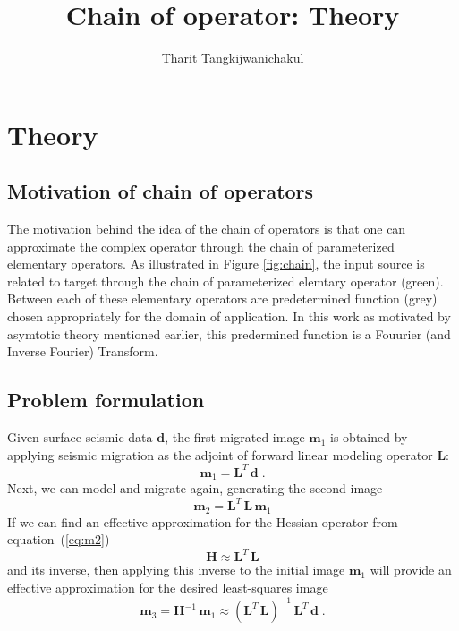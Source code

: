 \title{Chain of operator: Theory}
\author{Tharit Tangkijwanichakul}
\label{ch:chapter-background}
\maketitle
{}

\newcommand\inv[1]{#1\raisebox{1.15ex}{$\scriptscriptstyle-\!1$}} %



\section{Theory}


\subsection{Motivation of chain of operators}


The motivation behind the idea of the chain of operators is that one can approximate the complex operator through the chain of parameterized elementary operators. As illustrated in Figure \ref{fig:chain}, the input source is related to target through the chain of parameterized elemtary operator (green). Between each of these elementary operators are predetermined function (grey) chosen appropriately for the domain of application. In this work as motivated by asymtotic theory mentioned earlier, this predermined function is a Fouurier (and Inverse Fourier) Transform.

\subsection*{Problem formulation}
Given surface seismic data $\mathbf{d}$, the first migrated image $\mathbf{m}_1$ is obtained by applying seismic migration as the adjoint of forward linear modeling operator $\mathbf{L}$:
\begin{equation}
\label{eq:m1}
    \mathbf{m}_1=\mathbf{L}^{T}\,\mathbf{d}\;.
\end{equation}
Next, we can model and migrate again, generating the second image
\begin{equation}
\label{eq:m2}
    \mathbf{m}_2=\mathbf{L}^{T}\,\mathbf{L\,m}_1
\end{equation}
If we can find an effective approximation for the Hessian operator from equation~(\ref{eq:m2})
\begin{equation}
\label{eq:hessian}
    \mathbf{H} \approx \mathbf{L}^{T}\,\mathbf{L}
\end{equation}
and its inverse, then applying this inverse to the initial image $\mathbf{m}_1$ will provide an effective approximation for the desired least-squares image
\begin{equation}
\label{eq:m3}
    \mathbf{m}_3=\mathbf{H}^{-1}\,\mathbf{m}_1 
    \approx \left(\mathbf{L}^{T}\,\mathbf{L}\right)^{-1}\,\mathbf{L}^{T}\,\mathbf{d}\;.
\end{equation}

